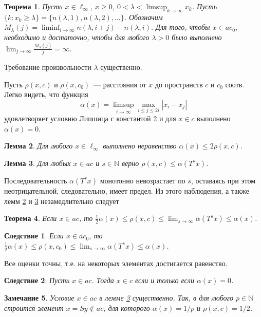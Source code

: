 \documentclass[a4paper,11pt]{article} %
\theoremstyle{plain}
\newtheorem{lemma}{Лемма}[section]
\newtheorem{theorem}[lemma]{Теорема}
\newtheorem{remark}[lemma]{Замечание}
\newtheorem{corollary}{Следствие}[lemma]
\begin{document}
\begin{theorem}
Пусть $x\in\ell_\infty$, $x \geq 0$,
$
	0<\lambda < \limsup_{k\to\infty} x_k
$.
Пусть $\{k: x_k \geq \lambda \} = \{n(\lambda,1),n(\lambda,2),...\}$.
Обозначим
$
	M_{\lambda}(j) = \liminf_{i\to\infty} n(\lambda,i+j) - n(\lambda,i)
$.
Для того, чтобы $x\in ac_0$, необходимо и достаточно, чтобы
для любого $\lambda>0$ было выполнено
$
	\lim_{j \to \infty} \frac{M_{\lambda}(j)}{j} = \infty
$.
\end{theorem}

Требование произвольности $\lambda$ существенно.



Пусть $\rho(x,c)$ и $\rho(x,c_0)$~--- расстояния от $x$ до пространств $c$
и $c_0$ соотв.
Легко видеть, что функция
\begin{equation*}
	\alpha(x) = \limsup_{i\to\infty} \max_{i \leq j \leq 2i} |x_i-x_j|
\end{equation*}
удовлетворяет условию Липшица с константой 2
и для $x\in c$ выполнено
$\alpha(x)=0$.

\begin{lemma}
\label{thm:alpha_x_leq_2_rho_x_c}
	Для любого $x\in\ell_\infty$
	выполнено неравенство
	$
		\alpha(x) \leq 2\rho(x, c)
	$.
\end{lemma}


\begin{lemma}
\label{thm:rho_x_c_leq_alpha_t_s_x}
	Для любых $x\in ac$ и $s\in\mathbb{N}$ верно
	$
		\rho(x,c)\leq \alpha(T^s x)
	$.
\end{lemma}


Последовательность $\alpha(T^s x)$ монотонно невозрастает по $s$,
оставаясь при этом неотрицательной, следовательно, имеет предел.
Из этого наблюдения, а также лемм \ref{thm:alpha_x_leq_2_rho_x_c} и \ref{thm:rho_x_c_leq_alpha_t_s_x}
незамедлительно следует
\begin{theorem}
	Если $x\in ac$, то
	$
		\frac{1}{2} \alpha(x) \leq \rho(x,c)\leq \lim_{s\to\infty} \alpha(T^s x) \leq \alpha(x)
	$.
\end{theorem}

\begin{corollary}
	Если $x\in ac_0$, то
	$
		\frac{1}{2} \alpha(x) \leq \rho(x,c_0)\leq \lim_{s\to\infty} \alpha(T^s x) \leq \alpha(x)
	$.
\end{corollary}
Все оценки точны, т.е. на некоторых элементах достигается равенство.
\begin{corollary}
	Пусть $x\in ac$.
	Тогда $x\in c$ если и только если $\alpha(x) = 0$.
\end{corollary}

\begin{remark}
	Условие $x\in ac$ в лемме \ref{thm:rho_x_c_leq_alpha_t_s_x} существенно.
	Так, в \cite{our-vzms-2018} для любого $p\in\mathbb{N}$ строится элемент $x=Sy\notin ac$,
	для которого $\alpha(x) = 1/p$ и $\rho(x,c)=1/2$.
\end{remark}


\printbibliography
\end{document}
